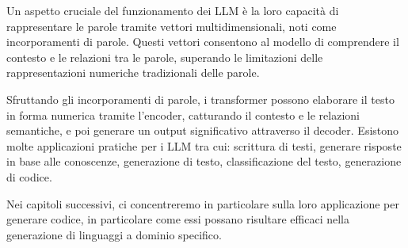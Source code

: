 Un aspetto cruciale del funzionamento dei LLM è la loro capacità di rappresentare le parole tramite vettori multidimensionali, noti come incorporamenti di parole. Questi vettori consentono al modello di comprendere il contesto e le relazioni tra le parole, superando le limitazioni delle rappresentazioni numeriche tradizionali delle parole.

Sfruttando gli incorporamenti di parole, i transformer possono elaborare il testo in forma numerica tramite l'encoder, catturando il contesto e le relazioni semantiche, e poi generare un output significativo attraverso il decoder.
Esistono molte applicazioni pratiche per i LLM tra cui: scrittura di testi, generare risposte in base alle conoscenze, generazione di testo, classificazione del testo, generazione di codice.

Nei capitoli successivi, ci concentreremo in particolare sulla loro applicazione per generare codice, in particolare come essi possano risultare efficaci nella generazione di linguaggi a dominio specifico.

